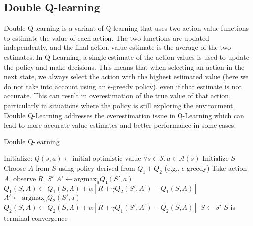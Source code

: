 \subsection{Double Q-learning}
Double Q-learning is a variant of Q-learning that uses two action-value functions to estimate the value of each action. The two functions are updated independently, and the final action-value estimate is the average of the two estimates. In Q-Learning, a single estimate of the action values is used to update the policy and make decisions. This means that when selecting an action in the next state, we always select the action with the highest estimated value (here we do not take into account using an $\epsilon$-greedy policy), even if that estimate is not accurate. This can result in overestimation of the true value of that action, particularly in situations where the policy is still exploring the environment. Double Q-Learning addresses the overestimation issue in Q-Learning which can lead to more accurate value estimates and better performance in some cases.
\begin{algorithm}
\caption{Double Q-learning}\label{algo:DQL}
\begin{algorithmic}[1]
\State Initialize:
\State \hspace{0.5cm} $Q(s,a) \gets \text{initial optimistic value } \forall s\in \mathcal{S}, a\in \mathcal{A}(s)$
\Repeat
\State Initialize $S$
\Repeat
\State Choose $A$ from $S$ using policy derived from $Q_1+Q_2$ (e.g., $\epsilon$-greedy)
\State Take action $A$, observe $R$, $S'$
\State $A' \gets \text{argmax}_a Q_1(S',a)$
\State $Q_1(S,A) \gets Q_1(S,A) + \alpha [R + \gamma Q_2(S',A') - Q_1(S,A)]$
\Else
\State $A' \gets \text{argmax}_a Q_2(S',a)$
\State $Q_2(S,A) \gets Q_2(S,A) + \alpha [R + \gamma Q_1(S',A') - Q_2(S,A)]$
\EndIf
\State $S \gets S'$
\Until $S$ is terminal
\Until convergence
\end{algorithmic}
\end{algorithm}
